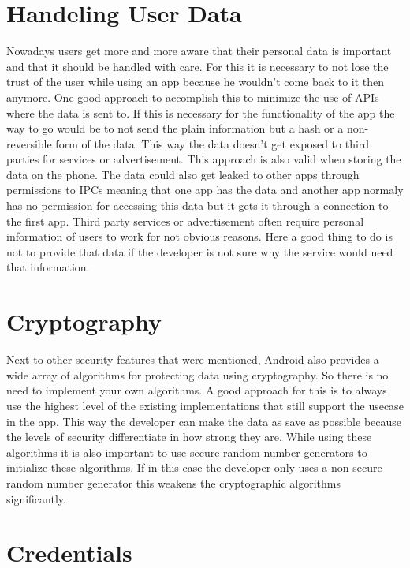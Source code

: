 \section{Handeling User Data}
\label{chp:howto:sec:userData}

Nowadays users get more and more aware that their personal data is important and that it should be handled with care. For this it is necessary to not lose the trust of the user while using an app because he wouldn't come back to it then anymore.
One good approach to accomplish this to minimize the use of APIs where the data is sent to. If this is necessary for the functionality of the app the way to go would be to not send the plain information but a hash or a non-reversible form of the data. This way the data doesn't get exposed to third parties for services or advertisement. This approach is also valid when storing the data on the phone.
The data could also get leaked to other apps through permissions to IPCs meaning that one app has the data and another app normaly has no permission for accessing this data but it gets it through a connection to the first app.
Third party services or advertisement often require personal information of users to work for not obvious reasons. Here a good thing to do is not to provide that data if the developer is not sure why the service would need that information.

\section{Cryptography}
\label{chp:howto:sec:cryptography}

Next to other security features that were mentioned, Android also provides a wide array of algorithms for protecting data using cryptography. So there is no need to implement your own algorithms.
A good approach for this is to always use the highest level of the existing implementations that still support the usecase in the app. This way the developer can make the data as save as possible because the levels of security differentiate in how strong they are.
While using these algorithms it is also important to use secure random number generators to initialize these algorithms. If in this case the developer only uses a non secure random number generator this weakens the cryptographic algorithms significantly.

\section{Credentials}
\label{chp:howto:sec:credentials}

